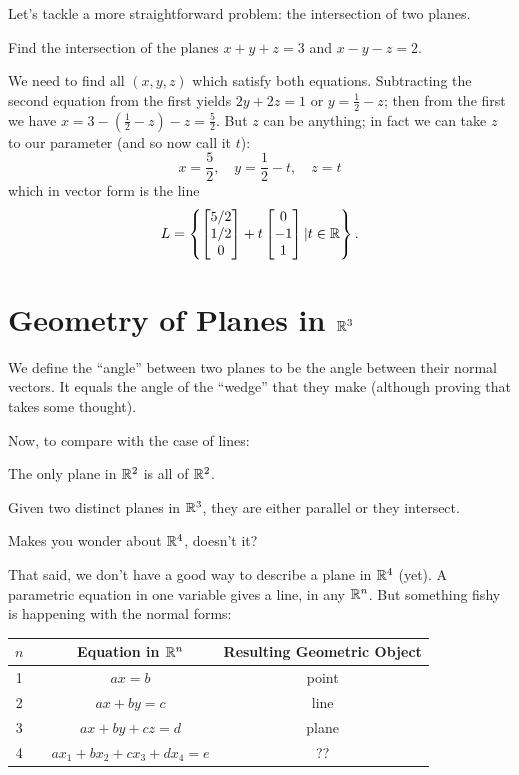 Let's tackle a more straightforward problem: the intersection of
two planes.

\begin{myprob} Find the intersection of the planes $x+y+z = 3$ and $x-y-z=2$.

\begin{mysol} We need to find all $(x,y,z)$ which satisfy both equations.
Subtracting the second equation from the first yields $2y+2z = 1$
or $y = \frac12-z$; then from the first we have $x = 3-(\frac12-z)-z
= \frac52$.  But $z$ can be anything; in fact we can take
$z$ to our parameter (and so now call it $t$):
$$
x = \frac52, \quad y=\frac12-t, \quad z=t
$$
which in vector form is the line
$$
L= \left\{ \left[ \begin{matrix} 5/2\\1/2\\0 \end{matrix} \right] + t \left[ \begin{matrix} 0\\-1\\1 \end{matrix} \right] | t\in \mathbb{R}\right\}.
$$
\end{mysol}\end{myprob}

\section{Geometry of Planes in \texorpdfstring{$\mathbb{R}^3$}{R3}}

We define the ``angle'' between two planes to
be the angle between their normal vectors.  It equals
the angle of the ``wedge'' that they make (although
proving that takes some thought).

Now, to compare with the case of lines:
 
The only plane in $\mathbb{R}^2$ is all of $\mathbb{R}^2$.

Given two distinct planes in $\mathbb{R}^3$, they are either parallel
or they intersect.

Makes you wonder about $\mathbb{R}^4$, doesn't it?

That said, we don't have a good way to describe a plane in $\mathbb{R}^4$
(yet).  
A parametric equation in one variable gives a line, in any
$\mathbb{R}^n$.  But something fishy is happening with the normal
forms:

\begin{center}
\begin{tabular}{cccc}
$n$ & & Equation in $\mathbb{R}^n$& Resulting Geometric Object \\
\hline
1 &\hphantom{XX} & $ax=b$ & point \\
2 & & $ax+by=c$ & line \\
3 & & $ax+by+cz =d$ & plane\\
4 & & $ax_1+bx_2+cx_3+dx_4=e$ & ??
\end{tabular}
\end{center}

